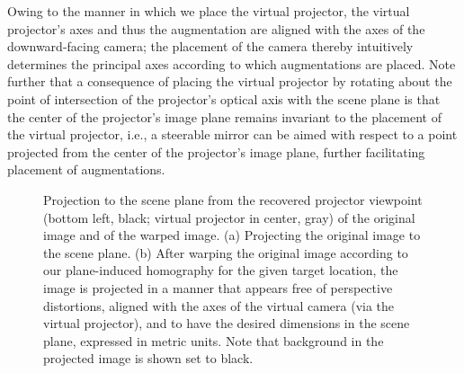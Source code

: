 \documentclass[review]{elsarticle}
\begin{document}
Owing to the manner in which we place the virtual projector, the virtual projector's axes and thus the augmentation are aligned with the axes of the downward-facing camera; the placement of the camera thereby intuitively determines the principal axes according to which augmentations are placed. Note further that a consequence of placing the virtual projector by rotating about the point of intersection of the projector's optical axis with the scene plane is that the center of the projector's image plane remains invariant to the placement of the virtual projector, i.e., a steerable mirror can be aimed with respect to a point projected from the center of the projector's image plane, further facilitating placement of augmentations.

\begin{figure}
    \centering
    \qquad
    \caption{Projection to the scene plane from the recovered projector viewpoint (bottom left, black; virtual projector in center, gray) of the original image and of the warped image. (a) Projecting the original image to the scene plane. (b) After warping the original image according to our plane-induced homography for the given target location, the image is projected in a manner that appears free of perspective distortions, aligned with the axes of the virtual camera (via the virtual projector), and to have the desired dimensions in the scene plane, expressed in metric units. Note that background in the projected image is shown set to black.}
    \label{fig:warp}
\end{figure}
\end{document}
